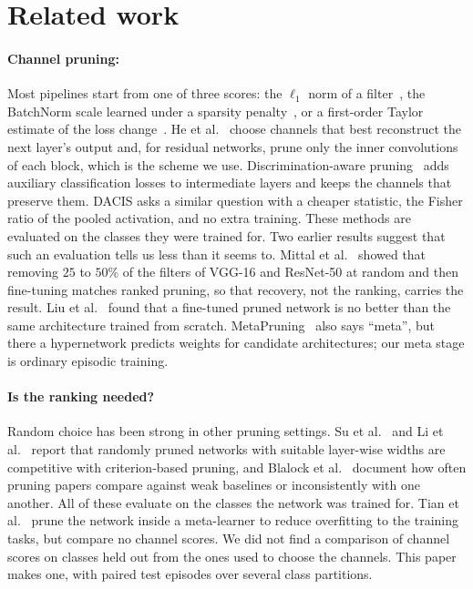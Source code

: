 \section{Related work}
\label{sec:related}

\paragraph{Channel pruning:}
Most pipelines start from one of three scores: the $\ell_1$ norm of a filter~\cite{li2017pruning}, the BatchNorm scale learned under a sparsity penalty~\cite{liu2017slimming}, or a first-order Taylor estimate of the loss change~\cite{molchanov2017pruning,molchanov2019importance}. He et al.~\cite{he2017channel} choose channels that best reconstruct the next layer's output and, for residual networks, prune only the inner convolutions of each block, which is the scheme we use. Discrimination-aware pruning~\cite{zhuang2018dcp} adds auxiliary classification losses to intermediate layers and keeps the channels that preserve them. DACIS asks a similar question with a cheaper statistic, the Fisher ratio of the pooled activation, and no extra training. These methods are evaluated on the classes they were trained for. Two earlier results suggest that such an evaluation tells us less than it seems to. Mittal et al.~\cite{mittal2018recovering} showed that removing $25$ to $50\%$ of the filters of VGG-16 and ResNet-50 at random and then fine-tuning matches ranked pruning, so that recovery, not the ranking, carries the result. Liu et al.~\cite{liu2019rethinking} found that a fine-tuned pruned network is no better than the same architecture trained from scratch. MetaPruning~\cite{liu2019metapruning} also says ``meta'', but there a hypernetwork predicts weights for candidate architectures; our meta stage is ordinary episodic training.

\paragraph{Is the ranking needed?}
Random choice has been strong in other pruning settings. Su et al.~\cite{su2020sanity} and Li et al.~\cite{li2022revisiting} report that randomly pruned networks with suitable layer-wise widths are competitive with criterion-based pruning, and Blalock et al.~\cite{blalock2020state} document how often pruning papers compare against weak baselines or inconsistently with one another. All of these evaluate on the classes the network was trained for. Tian et al.~\cite{tian2020mwnp} prune the network inside a meta-learner to reduce overfitting to the training tasks, but compare no channel scores. We did not find a comparison of channel scores on classes held out from the ones used to choose the channels. This paper makes one, with paired test episodes over several class partitions.

